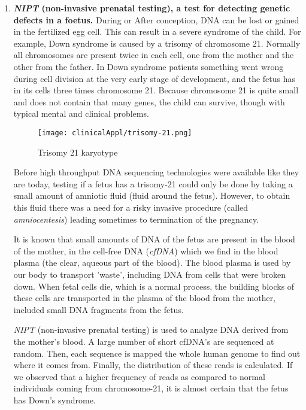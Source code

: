 \begin{enumerate}
	\item \textbf{\emph{NIPT} (non-invasive prenatal testing), a test for detecting genetic defects in a foetus.}\newline
	During or After conception, DNA can be lost or gained in the fertilized egg cell. This can result in a severe syndrome of the child. For example, Down syndrome is caused by a trisomy of chromosome 21. Normally all chromosomes are present twice in each cell, one from the mother and the other from the father. In Down syndrome patients something went wrong during cell division at the very early stage of development, and the fetus has in its cells three times chromosome 21. 
	Because chromosome 21 is quite small and does not contain that many genes, the child can survive, though with typical mental and clinical problems.
	
	\begin{figure}[H]
		\centering
		\texttt{[image: clinicalAppl/trisomy-21.png]}
		\caption{Trisomy 21 karyotype}
		\label{fig:tri21}
	\end{figure}
	
	
	Before high throughput DNA sequencing technologies were available like they are today, testing if a fetus has a trisomy-21 could only be done by taking a small amount of amniotic fluid (fluid around the fetus). However, to obtain this fluid there was a need for a risky invasive procedure (called \emph{amniocentesis}) leading sometimes to termination of the pregnancy.
	
	It is known that small amounts of DNA of the fetus are present in the blood of the mother, in the cell-free DNA (\emph{cfDNA}) which we find in the blood plasma (the clear, aqueous part of the blood). The blood plasma is used by our body to transport 'waste', including DNA from cells that were broken down. When fetal cells die, which is a normal process, the building blocks of these cells are transported in the plasma of the blood from the mother, included small DNA fragments from the fetus.
	
	\emph{NIPT} (non-invasive prenatal testing) is used to analyze DNA derived from the mother's blood. A large number of short cfDNA's are sequenced at random.  Then, each sequence is mapped the whole human genome to find out where it comes from. Finally, the distribution of these reads is calculated. If we observed that a higher frequency of reads as compared to normal individuals coming from chromosome-21, it is almost certain that the fetus has Down's syndrome.
	

\end{enumerate}
